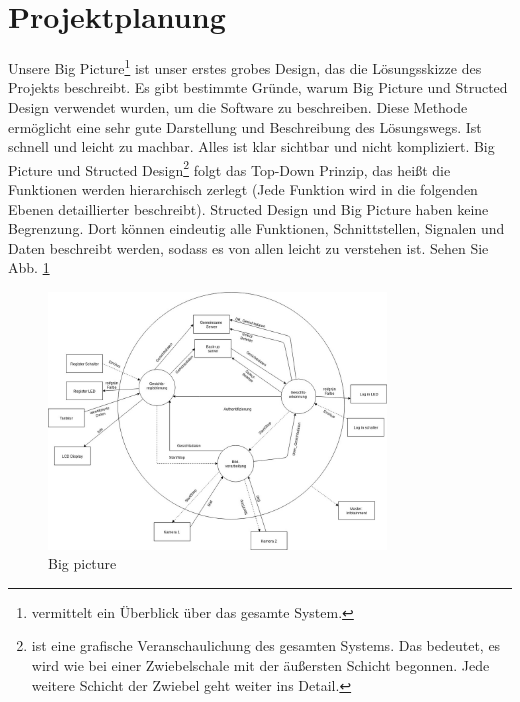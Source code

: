 \section{Projektplanung}
\begin{flushleft}
	Unsere Big Picture\footnote{vermittelt ein \"Uberblick \"uber das gesamte System.\cite{Bigpicture}} ist unser erstes grobes Design, das die Lösungsskizze des Projekts beschreibt. Es gibt bestimmte Gründe, warum Big Picture und Structed Design verwendet wurden, um die Software zu beschreiben. Diese Methode ermöglicht eine sehr gute Darstellung und Beschreibung des Lösungswegs. Ist schnell und leicht zu machbar. Alles ist klar sichtbar und nicht kompliziert. Big Picture und Structed Design\footnote{ist eine grafische Veranschaulichung des gesamten Systems. Das bedeutet, es wird wie bei einer Zwiebelschale mit der \"au{\ss}ersten Schicht begonnen. Jede weitere Schicht der Zwiebel geht weiter ins Detail.\cite{Bigpicture}} folgt das Top-Down Prinzip, das heißt die Funktionen werden hierarchisch zerlegt (Jede Funktion wird in die folgenden Ebenen detaillierter beschreibt). Structed Design und Big Picture haben keine Begrenzung. Dort können eindeutig alle Funktionen, Schnittstellen, Signalen und Daten beschreibt werden, sodass es von allen leicht zu verstehen ist. Sehen Sie Abb. \ref{fig:bigpicture}
\end{flushleft}
\begin{figure}[ht]
	\includegraphics[width=0.8\textwidth]{./figures/Big_Picture.jpg}
	\centering
	\caption{Big picture}
	\label{fig:bigpicture}
\end{figure}

